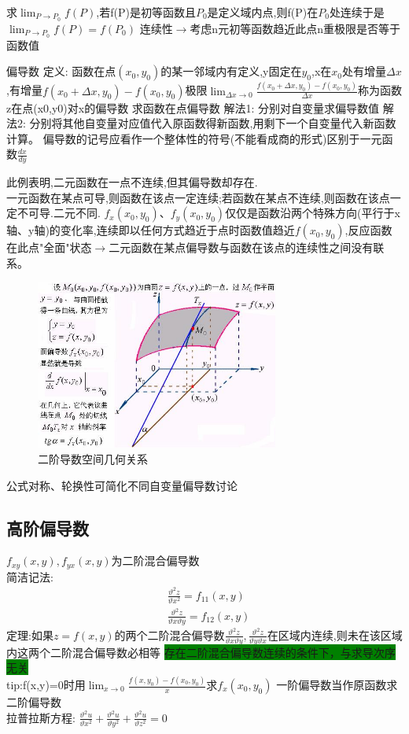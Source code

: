 \documentclass[10pt, a4paper, oneside]{ctexart}
\begin{document}
\begin{sloppypar}
	求$\lim_{P \to P_0}f(P)$,若f(P)是初等函数且$P_0$是定义域内点,则f(P)在$P_0$处连续于是$\lim_{P \to P_0}f(P)=f(P_0)$
	连续性$\to$考虑n元初等函数趋近此点n重极限是否等于函数值

	偏导数
	定义:
	函数在点$(x_0,y_0)$的某一邻域内有定义,y固定在$y_0$,x在$x_0$处有增量$\Delta x$,有增量$f(x_0+\Delta x,y_0)-f(x_0,y_0)$极限$\lim_{\Delta x \to 0}\frac{f(x_0 + \Delta x, y_0)-f(x_0,y_0)}{\Delta x}$称为函数z在点(x0,y0)对x的偏导数
	求函数在点偏导数
	解法1:
	分别对自变量求偏导数值
	解法2:
	分别将其他自变量对应值代入原函数得新函数,用剩下一个自变量代入新函数计算。
	偏导数的记号应看作一个整体性的符号(不能看成商的形式)区别于一元函数$\frac{dx}{dy}$

	此例表明,二元函数在一点不连续,但其偏导数却存在.\\
	一元函数在某点可导,则函数在该点一定连续;若函数在某点不连续,则函数在该点一定不可导.二元不同.
	$f_x(x_0, y_0)、f_y(x_0, y_0)$仅仅是函数沿两个特殊方向(平行于x轴、y轴)的变化率,连续即以任何方式趋近于点时函数值趋近$f(x_0,y_0)$,反应函数在此点"全面"状态$\to$二元函数在某点偏导数与函数在该点的连续性之间没有联系。\\
	\begin{figure}[htbp]
		\centering
		\includegraphics[width=8cm]{image126.jpg}
		\caption{二阶导数空间几何关系}
	\end{figure}
	公式对称、轮换性可简化不同自变量偏导数讨论
	\subsection{高阶偏导数}
	$f_{xy}(x,y),f_{yx}(x,y)$为二阶混合偏导数\\
	简洁记法:
	\begin{align}
		 & \frac{\vartheta^2 z}{\vartheta x^2}=f_{11}(x,y) \\ &\frac{\vartheta^2 z}{\vartheta x\vartheta y }=f_{12}(x,y)
	\end{align}
	定理:如果$z=f(x,y)$的两个二阶混合偏导数$\frac{\vartheta^2 z}{\vartheta x\vartheta y},\frac{\vartheta^2 z}{\vartheta y\vartheta x}$在区域内连续,则未在该区域内这两个二阶混合偏导数必相等
	\colorbox{green}{存在二阶混合偏导数连续的条件下，与求导次序无关}\\
	tip:f(x,y)=0时用$\lim_{x\to 0}\frac{f(x,y_0)-f(x_0,y_0)}{x}求f_x(x_0,y_0)$
	一阶偏导数当作原函数求二阶偏导数\\
	拉普拉斯方程:
	$\frac{\vartheta^2u}{\vartheta x^2}+\frac{\vartheta^2u}{\vartheta y^2}+\frac{\vartheta^2u}{\vartheta z^2}=0$


\end{sloppypar}
\end{document}
